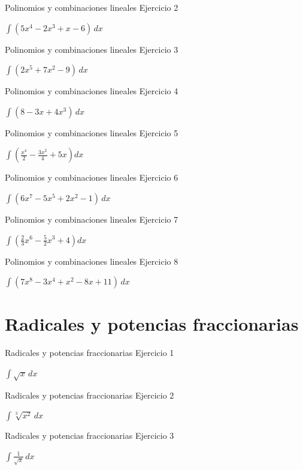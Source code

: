 \documentclass[10pt,aspectratio=169]{beamer}
\newcommand{\ejercicio}[1]{%
  \begin{center}
  \vfill
  {\fontsize{24}{30}\selectfont #1}
  \vfill
  \end{center}
}
\begin{document}
\begin{frame}{Polinomios y combinaciones lineales}
\small Ejercicio 2
\ejercicio{$\displaystyle \int(5x^4-2x^3+x-6)\,dx$}
\end{frame}

\begin{frame}{Polinomios y combinaciones lineales}
\small Ejercicio 3
\ejercicio{$\displaystyle \int(2x^5+7x^2-9)\,dx$}
\end{frame}

\begin{frame}{Polinomios y combinaciones lineales}
\small Ejercicio 4
\ejercicio{$\displaystyle \int(8-3x+4x^3)\,dx$}
\end{frame}

\begin{frame}{Polinomios y combinaciones lineales}
\small Ejercicio 5
\ejercicio{$\displaystyle \int\left(\frac{x^4}{2}-\frac{3x^2}{4}+5x\right)dx$}
\end{frame}

\begin{frame}{Polinomios y combinaciones lineales}
\small Ejercicio 6
\ejercicio{$\displaystyle \int(6x^7-5x^5+2x^2-1)\,dx$}
\end{frame}

\begin{frame}{Polinomios y combinaciones lineales}
\small Ejercicio 7
\ejercicio{$\displaystyle \int\left(\frac{2}{3}x^6-\frac{5}{2}x^3+4\right)dx$}
\end{frame}

\begin{frame}{Polinomios y combinaciones lineales}
\small Ejercicio 8
\ejercicio{$\displaystyle \int(7x^8-3x^4+x^2-8x+11)\,dx$}
\end{frame}

\section{Radicales y potencias fraccionarias}
\begin{frame}{Radicales y potencias fraccionarias}
\small Ejercicio 1
\ejercicio{$\displaystyle \int \sqrt{x}\,dx$}
\end{frame}

\begin{frame}{Radicales y potencias fraccionarias}
\small Ejercicio 2
\ejercicio{$\displaystyle \int \sqrt[3]{x^2}\,dx$}
\end{frame}

\begin{frame}{Radicales y potencias fraccionarias}
\small Ejercicio 3
\ejercicio{$\displaystyle \int \frac{1}{\sqrt{x}}\,dx$}
\end{frame}
\end{document}
